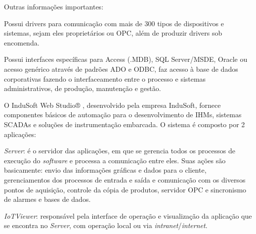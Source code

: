        \begin{figure}[!h]
	    \end{figure}

	    
	    Outras informações importantes:
	    
	    \begin{alineascomponto}
        	\item Possui drivers para comunicação com mais de 300 tipos de dispositivos e sistemas, sejam eles proprietários ou \gls{OPC}, além de produzir drivers sob encomenda.
        	\item Possui interfaces específicas para Access (.MDB), SQL Server/MSDE, Oracle ou acesso genérico através de padrões ADO e ODBC, faz acesso à base de dados corporativas fazendo o interfaceamento entre o processo e sistemas administrativos, de produção, manutenção e gestão.
        \end{alineascomponto}
	    
    \label{sec:indusoft}

        O InduSoft Web Studio® \cite{InduSoft}, desenvolvido pela empresa InduSoft, fornece componentes básicos de automação para o desenvolvimento de \glspl{IHM}, sistemas \glspl{SCADA} e soluções de instrumentação embarcada. O sistema é composto por 2 aplicações:
        
        \begin{alineascomponto}
            \item \textit{Server}: é o servidor das aplicações, em que se gerencia todos os processos de execução do \textit{software} e processa a comunicação entre eles. Suas ações são basicamente: envio das informações gráficas e dados para o cliente, gerenciamentos dos processos de entrada e saída e comunicação com os diversos pontos de aquisição, controle da cópia de produtos, servidor OPC e sincronismo de alarmes e bases de dados.
        	\item \textit{IoTViewer}: responsável pela interface de operação e visualização da aplicação que se encontra no \textit{Server}, com operação local ou via \textit{intranet}/\textit{internet}.
        \end{alineascomponto}
    

